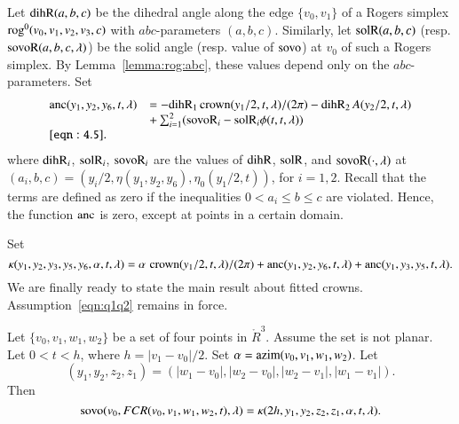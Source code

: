 Let ${\operatorname{dihR}}(a,b,c)$ be the dihedral angle along the edge
$\{v_0,v_1\}$ of a
Rogers simplex ${\operatorname{rog}}^0(v_0,v_1,v_2,v_3,c)$ with $abc$-parameters
$(a,b,c)$.  Similarly, let ${\operatorname{solR}}(a,b,c)$ (resp. ${\operatorname{sovoR}}(a,b,c,\lambda)$)
be the solid angle (resp. value of ${\operatorname{sovo}}$)
at $v_0$ of such a Rogers simplex.  By Lemma~\ref{lemma:rog:abc},
these values depend only on the $abc$-parameters.
Set
    \begin{equation}
    \begin{array}{lll}
    \anc(y_1,y_2,y_6,t,\lambda) &= 
     -\op{dihR}_1\cro(y_1/2,t,\lambda)/(2\pi)
    -\op{dihR}_2\, A(y_2/2,t,\lambda) \\
      &+\sum_{i=1}^2 (\op{sovoR}_i - \op{solR}_i \phi(t,t,\lambda))\\
    \tlabel{eqn:4.5}
    \end{array}
    \end{equation}
where ${\operatorname{dihR}}_i$, ${\operatorname{solR}}_i$, ${\operatorname{sovoR}}_i$ are the values
of ${\operatorname{dihR}}$, ${\operatorname{solR}}$, and ${\operatorname{sovoR}}(\cdot,\lambda)$
at $(a_i,b,c) = (y_i/2,\eta(y_1,y_2,y_6),\eta_0(y_1/2,t))$, for $i=1,2$.
Recall that the terms are defined as zero if the inequalities
$0 < a_i \le b\le c$ are violated.  Hence, the function $\operatorname{anc}$ is
zero, except at points in a certain domain.

Set
    $$\kappa(y_1,y_2,y_3,y_5,y_6,\alpha,t,\lambda) =
   \alpha\,\operatorname{crown}(y_1/2,t,\lambda)/(2\pi) +
        \operatorname{anc}(y_1,y_2,y_6,t,\lambda)+\operatorname{anc}(y_1,y_3,y_5,t,\lambda).
    $$
We are finally ready to state the main result about fitted crowns.
Assumption~\ref{eqn:q1q2} remains in force.

\begin{lemma}\label{lemma:sovo:FCR}
Let $\{v_0,v_1,w_1,w_2\}$ be a set of four points in $\ring{R}^3$.
Assume the set is not planar.
Let $0 < t < h$, where $h = |v_1-v_0|/2$.
Set $\alpha = {\operatorname{azim}}(v_0,v_1,w_1,w_2)$.
Let 
 $$(y_1,y_2,z_2,z_1) =
   (|w_1-v_0|,|w_2-v_0|,|w_2-v_1|,|w_1-v_1|).
 $$
Then
$$
{\operatorname{sovo}}(v_0,FCR(v_0,v_1,w_1,w_2,t),\lambda) =
 \kappa(2h,y_1,y_2,z_2,z_1,\alpha,t,\lambda).
$$
\end{lemma}

